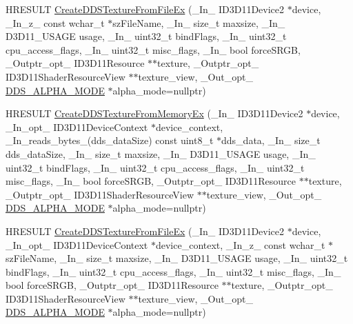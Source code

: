 \begin{DoxyCompactItemize}
\item 
H\+R\+E\+S\+U\+LT \hyperlink{namespacemage_ae578f902db78efb1e9466399d72fbdbd}{Create\+D\+D\+S\+Texture\+From\+File\+Ex} (\+\_\+\+In\+\_\+ I\+D3\+D11\+Device2 $\ast$device, \+\_\+\+In\+\_\+z\+\_\+ const wchar\+\_\+t $\ast$sz\+File\+Name, \+\_\+\+In\+\_\+ size\+\_\+t maxsize, \+\_\+\+In\+\_\+ D3\+D11\+\_\+\+U\+S\+A\+GE usage, \+\_\+\+In\+\_\+ uint32\+\_\+t bind\+Flags, \+\_\+\+In\+\_\+ uint32\+\_\+t cpu\+\_\+access\+\_\+flags, \+\_\+\+In\+\_\+ uint32\+\_\+t misc\+\_\+flags, \+\_\+\+In\+\_\+ bool force\+S\+R\+GB, \+\_\+\+Outptr\+\_\+opt\+\_\+ I\+D3\+D11\+Resource $\ast$$\ast$texture, \+\_\+\+Outptr\+\_\+opt\+\_\+ I\+D3\+D11\+Shader\+Resource\+View $\ast$$\ast$texture\+\_\+view, \+\_\+\+Out\+\_\+opt\+\_\+ \hyperlink{namespacemage_a0c586a2bad862f4858900ca121ca80c2}{D\+D\+S\+\_\+\+A\+L\+P\+H\+A\+\_\+\+M\+O\+DE} $\ast$alpha\+\_\+mode=nullptr)
\item 
H\+R\+E\+S\+U\+LT \hyperlink{namespacemage_a1325dd45fa581827025d0207029bb7f0}{Create\+D\+D\+S\+Texture\+From\+Memory\+Ex} (\+\_\+\+In\+\_\+ I\+D3\+D11\+Device2 $\ast$device, \+\_\+\+In\+\_\+opt\+\_\+ I\+D3\+D11\+Device\+Context $\ast$device\+\_\+context, \+\_\+\+In\+\_\+reads\+\_\+bytes\+\_\+(dds\+\_\+data\+Size) const uint8\+\_\+t $\ast$dds\+\_\+data, \+\_\+\+In\+\_\+ size\+\_\+t dds\+\_\+data\+Size, \+\_\+\+In\+\_\+ size\+\_\+t maxsize, \+\_\+\+In\+\_\+ D3\+D11\+\_\+\+U\+S\+A\+GE usage, \+\_\+\+In\+\_\+ uint32\+\_\+t bind\+Flags, \+\_\+\+In\+\_\+ uint32\+\_\+t cpu\+\_\+access\+\_\+flags, \+\_\+\+In\+\_\+ uint32\+\_\+t misc\+\_\+flags, \+\_\+\+In\+\_\+ bool force\+S\+R\+GB, \+\_\+\+Outptr\+\_\+opt\+\_\+ I\+D3\+D11\+Resource $\ast$$\ast$texture, \+\_\+\+Outptr\+\_\+opt\+\_\+ I\+D3\+D11\+Shader\+Resource\+View $\ast$$\ast$texture\+\_\+view, \+\_\+\+Out\+\_\+opt\+\_\+ \hyperlink{namespacemage_a0c586a2bad862f4858900ca121ca80c2}{D\+D\+S\+\_\+\+A\+L\+P\+H\+A\+\_\+\+M\+O\+DE} $\ast$alpha\+\_\+mode=nullptr)
\item 
H\+R\+E\+S\+U\+LT \hyperlink{namespacemage_ac95c9d854152c94c77105e07ab3890e0}{Create\+D\+D\+S\+Texture\+From\+File\+Ex} (\+\_\+\+In\+\_\+ I\+D3\+D11\+Device2 $\ast$device, \+\_\+\+In\+\_\+opt\+\_\+ I\+D3\+D11\+Device\+Context $\ast$device\+\_\+context, \+\_\+\+In\+\_\+z\+\_\+ const wchar\+\_\+t $\ast$sz\+File\+Name, \+\_\+\+In\+\_\+ size\+\_\+t maxsize, \+\_\+\+In\+\_\+ D3\+D11\+\_\+\+U\+S\+A\+GE usage, \+\_\+\+In\+\_\+ uint32\+\_\+t bind\+Flags, \+\_\+\+In\+\_\+ uint32\+\_\+t cpu\+\_\+access\+\_\+flags, \+\_\+\+In\+\_\+ uint32\+\_\+t misc\+\_\+flags, \+\_\+\+In\+\_\+ bool force\+S\+R\+GB, \+\_\+\+Outptr\+\_\+opt\+\_\+ I\+D3\+D11\+Resource $\ast$$\ast$texture, \+\_\+\+Outptr\+\_\+opt\+\_\+ I\+D3\+D11\+Shader\+Resource\+View $\ast$$\ast$texture\+\_\+view, \+\_\+\+Out\+\_\+opt\+\_\+ \hyperlink{namespacemage_a0c586a2bad862f4858900ca121ca80c2}{D\+D\+S\+\_\+\+A\+L\+P\+H\+A\+\_\+\+M\+O\+DE} $\ast$alpha\+\_\+mode=nullptr)

\end{DoxyCompactItemize}
